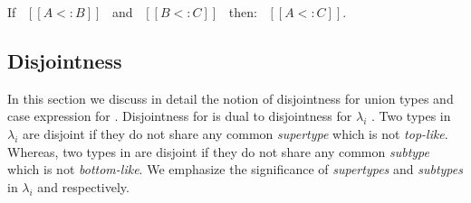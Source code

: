 \begin{comment}
\begin{proof}
  By induction on type A. All cases are trivial to prove.
\end{proof}
\end{comment}

\begin{lemma}
  If \ $[[A <: B]]$ \ and \ $[[B <: C]]$ \ then: \ $[[A <: C]]$.
  \label{lemma:union:trans}
\end{lemma}

\begin{comment}
\begin{proof}
  By induction on type B.
  \begin{itemize}
    \item Cases $[[Top]]$, $[[Bot]]$ and $[[Int]]$ are trivial to prove.
    \item Case $[[A -> B]]$ requires double induction on type $[[C]]$
          and $[[A]]$.
    \item Case $[[A \/ B]]$ requires \Cref{lemma:union:sub-or}
  \end{itemize}
\end{proof}

\begin{lemma}[Subtyping Union Inversion]
\label{lemma:union:sub-or}
  If \ $[[A \/ B <: C]]$ then:
  \begin{enumerate}
    \item $[[A <: C]]$ and
    \item $[[B <: C]]$
  \end{enumerate}
\end{lemma}
\end{comment}


\subsection{Disjointness}
\label{sec:union:disj}
In this section we discuss in detail the notion of disjointness for union types and case expression
for \cal.
Disjointness for \cal is dual to disjointness for $\lambda_i$ \cite{oliveira2016disjoint}.
Two types in $\lambda_i$ are disjoint if they do not share any common \emph{supertype}
which is not \emph{top-like}.
Whereas, two types in \cal are disjoint if they do not share any common \emph{subtype} which is not
\emph{bottom-like}. We emphasize the significance of \emph{supertypes} and \emph{subtypes} in
$\lambda_i$ and \cal respectively.

